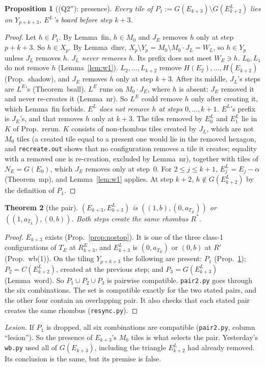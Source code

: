 \documentclass[11pt]{article}
\newtheorem{theorem}{Theorem}\newtheorem{lemma}[theorem]{Lemma}\newtheorem{proposition}[theorem]{Proposition}
\theoremstyle{remark}\newtheorem{remark}[theorem]{Remark}
\begin{document}
\begin{proposition}[(Q2$''$): presence]\label{prop:q2}
Every tile of $P_1:=G(E_{k+3})\setminus G(E^L_{k+2})$ lies on $Y_{p+k+3}$, $E^L$'s board before step $k+3$.
\end{proposition}
\begin{proof}
Let $h\in P_1$. By Lemma~fin, $h\in M_0$ and $J_E$ removes $h$ only at step $p+k+3$. So $h\in X_p$. By Lemma~dinv, $X_p\setminus Y_p=M_0\setminus M_0\cdot J_L=W_L$, so $h\in Y_p$ unless $J_L$ removes $h$.
\emph{$J_L$ never removes $h$.} Its prefix does not meet $W_E\ni h$. $L_0,L_1$ do not remove $h$ (Lemma~\ref{lem:w1}). $L_2,\dots,L_{k+2}$ remove $H(E_2),\dots,H(E_{k+2})$ (Prop.~shadow), and $J_E$ removes $h$ only at step $k+3$. After its middle, $J_L$'s steps are $L^E$'s (Theorem~bsall). $L^E$ runs on $M_0\cdot J_E$, where $h$ is absent: $J_E$ removed it and never re-creates it (Lemma~nr). So $L^E$ could remove $h$ only after creating it, which Lemma~fin forbids.
\emph{$E^L$ does not remove $h$ at steps $0,\dots,k+1$.} $E^L$'s prefix is $J_E$'s, and that removes $h$ only at $k+3$. The tiles removed by $E^L_0$ and $E^L_1$ lie in $K$ of Prop.~rerun. $K$ consists of non-rhombus tiles created by $J_L$, which are not $M_0$ tiles (a created tile equal to a present one would lie in the removed hexagon, and \texttt{recreate.out} shows that no configuration removes a tile it creates; equality with a removed one is re-creation, excluded by Lemma~nr), together with tiles of $N_E=G(E_0)$, which $J_E$ removes only at step~$0$. For $2\le j\le k+1$, $E^L_j=E_j-\alpha$ (Theorem~mp), and Lemma~\ref{lem:w1} applies. At step $k+2$, $h\notin G(E^L_{k+2})$ by the definition of $P_1$.
\end{proof}

\begin{theorem}[the pair]\label{thm:pair}
$(E_{k+3},E^L_{k+3})$ is $((1,b),(0,a_{T_E}))$ or $((1,a_{T_L}),(0,b))$. Both steps create the same rhombus $R^*$.
\end{theorem}
\begin{proof}
$E_{k+3}$ exists (Prop.~\ref{prop:nostop}). It is one of the three class-1 configurations of $T_E$ at $R^E_{k+3}$, and $E^L_{k+3}$ is $(0,a_{T_E})$ or $(0,b)$ at $R'$ (Prop.~wb(1)). On the tiling $Y_{p+k+3}$ the following are present: $P_1$ (Prop.~\ref{prop:q2}); $P_2=C(E^L_{k+2})$, created at the previous step; and $P_3=G(E^L_{k+3})$ (Lemma~word). So $P_1\cup P_2\cup P_3$ is pairwise compatible. \texttt{pair2.py} goes through the six combinations. The set is compatible exactly for the two stated pairs, and the other four contain an overlapping pair. It also checks that each stated pair creates the same rhombus (\texttt{resync.py}).
\end{proof}
\noindent\emph{Lesion.} If $P_1$ is dropped, all six combinations are compatible (\texttt{pair2.py}, column ``lesion''). So the presence of $E_{k+3}$'s $M_0$ tiles is what selects the pair. Yesterday's \texttt{wb.py} used all of $G(E_{k+3})$, including the triangle $E^L_{k+2}$ had already removed. Its conclusion is the same, but its premise is false.
\end{document}
